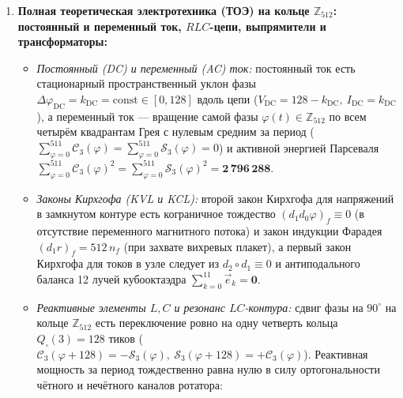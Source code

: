 \begin{enumerate}[label=\textbf{\arabic*.},noitemsep]
  достигая абсолютного максимума ровно на биссектрисе октанта $\Delta\varphi^* = K_P(3) = 64$ ($V = I = 64$, закон согласования импедансов). При этом, пока пошаговый сдвиг фазы между соседними узлами решётки удерживается внутри бесфононного коридора $|\Delta\varphi| \le 40 < 41$, число рождаемых тепловых фононов тождественно равно $\hat{n}_E(\Delta\varphi) = \lfloor|\Delta\varphi|/41\rfloor = \mathbf{0}$ --- фазовая эстафета бежит по проводнику \textbf{без омического сопротивления и без выделения тепла (сверхток)}! А омическое сопротивление и джоулев нагрев возникают тогда и только тогда, когда на примесях, дефектах или тепловых колебаниях решётки локальный скачок фазы пробивает порог дискретности $|\Delta\varphi| \ge 41$, сбрасывая $\hat{n}_E(\Delta\varphi) \in \{1,\dots,6\}$ квантов энергии в фононный нагрев провода (и одновременно рождая вокруг провода магнитные вихревые плакеты $B_f = 512\,n_f$ по формуле~\eqref{eq:course-stokes-chern} из-за скачка фазы между проводом и окружающим воздухом).
\item \textbf{Полная теоретическая электротехника (ТОЭ) на кольце $\mathbb{Z}_{512}$: постоянный и переменный ток, $RLC$-цепи, выпрямители и трансформаторы:}
  \begin{itemize}[noitemsep]
  \item \emph{Постоянный (DC) и переменный (AC) ток:} постоянный ток есть стационарный пространственный уклон фазы $\Delta\varphi_{\mathrm{DC}} = k_{\mathrm{DC}} = \mathrm{const}\in[0,128]$ вдоль цепи ($V_{\mathrm{DC}} = 128 - k_{\mathrm{DC}},\ I_{\mathrm{DC}} = k_{\mathrm{DC}}$), а переменный ток --- вращение самой фазы $\varphi(t)\in\mathbb{Z}_{512}$ по всем четырём квадрантам Грея с нулевым средним за период ($\sum_{\varphi=0}^{511}\mathcal{C}_3(\varphi) = \sum_{\varphi=0}^{511}\mathcal{S}_3(\varphi) = 0$) и активной энергией Парсеваля $\sum_{\varphi=0}^{511}\mathcal{C}_3(\varphi)^2 = \sum_{\varphi=0}^{511}\mathcal{S}_3(\varphi)^2 = \mathbf{2\,796\,288}$.
  \item \emph{Законы Кирхгофа (KVL и KCL):} второй закон Кирхгофа для напряжений в замкнутом контуре есть кограничное тождество $(d_1 d_0\varphi)_f \equiv 0$ (в отсутствие переменного магнитного потока) и закон индукции Фарадея $(d_1 r)_f = 512\,n_f$ (при захвате вихревых плакет), а первый закон Кирхгофа для токов в узле следует из $d_2\circ d_1 \equiv 0$ и антиподального баланса 12 лучей кубооктаэдра $\sum_{k=0}^{11}\vec{e}_k = \mathbf{0}$.
  \item \emph{Реактивные элементы $L, C$ и резонанс $LC$-контура:} сдвиг фазы на $90^\circ$ на кольце $\mathbb{Z}_{512}$ есть переключение ровно на одну четверть кольца $Q_\square(3) = 128$ тиков ($\mathcal{C}_3(\varphi+128) = -\mathcal{S}_3(\varphi),\ \mathcal{S}_3(\varphi+128) = +\mathcal{C}_3(\varphi)$). Реактивная мощность за период тождественно равна нулю в силу ортогональности чётного и нечётного каналов ротатора:

\end{itemize}
\end{enumerate}
